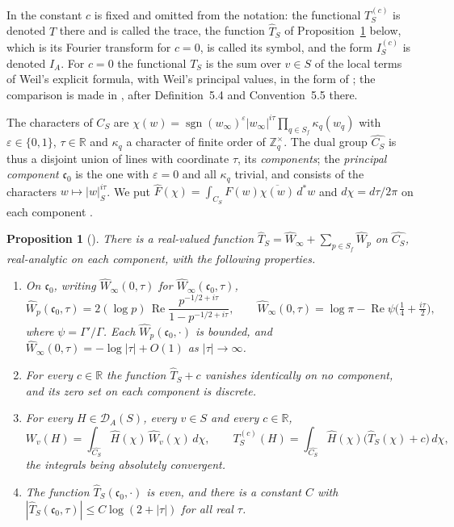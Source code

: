 \documentclass[11pt]{amsart}
\newtheorem{proposition}[theorem]{Proposition}
\theoremstyle{remark}
\numberwithin{equation}{section}
\newcommand{\R}{\mathbb R}
\newcommand{\Z}{\mathbb Z}
\newcommand{\Rel}{\operatorname{Re}}
\newcommand{\DA}{\mathcal D_A}
\newcommand{\CS}{C_S}
\newcommand{\cz}{\mathfrak c_0}
\begin{document}
In \cite{P43} the constant $c$ is fixed and omitted from the notation: the
functional $T^{(c)}_S$ is denoted $T$ there and is called the trace, the
function $\widehat T_S$ of Proposition~\ref{prop:symbol} below, which is its
Fourier transform for $c=0$, is called its symbol, and the form $I^{(c)}_S$
is denoted $I_A$.  For $c=0$ the functional $T_S$ is the sum over $v\in S$ of the local
terms of Weil's explicit formula, with Weil's principal values, in the form
of \cite[Appendix~II]{Connes99}; the comparison is made in
\cite[Section~5]{P43}, after Definition~5.4 and Convention~5.5 there.

The characters of $\CS$ are
$\chi(w)=\operatorname{sgn}(w_\infty)^{\varepsilon}|w_\infty|^{i\tau}
\prod_{q\in S_f}\kappa_q(w_q)$ with $\varepsilon\in\{0,1\}$, $\tau\in\R$ and
$\kappa_q$ a character of finite order of $\Z_q^\times$.  The dual group
$\widehat{\CS}$ is thus a disjoint union of lines with coordinate $\tau$, its
\emph{components}; the \emph{principal component} $\cz$ is the one with
$\varepsilon=0$ and all $\kappa_q$ trivial, and consists of the characters
$w\mapsto|w|_S^{i\tau}$.  We put
$\widehat F(\chi)=\int_{\CS}F(w)\overline{\chi(w)}\,d^*w$ and
$d\chi=d\tau/2\pi$ on each component \cite[(40), (41) and the text after (43)]{P43}.

\begin{proposition}[{\cite[Theorem~5.12 and (69)]{P43}}]
\label{prop:symbol}
There is a real-valued function
$\widehat T_S=\widehat W_\infty+\sum_{p\in S_f}\widehat W_p$ on
$\widehat{\CS}$, real-analytic on each component, with the following
properties.
\begin{enumerate}
\item[(a)] On $\cz$, writing $\widehat W_\infty(0,\tau)$ for
$\widehat W_\infty(\cz,\tau)$,
\begin{equation}
\label{eq:symbolclosed}
  \widehat W_p(\cz,\tau)=2(\log p)\,\Rel\frac{p^{-1/2+i\tau}}{1-p^{-1/2+i\tau}},
  \qquad
  \widehat W_\infty(0,\tau)=\log\pi-\Rel\psi\bigl(\tfrac14+\tfrac{i\tau}2\bigr),
\end{equation}
where $\psi=\Gamma'/\Gamma$.  Each $\widehat W_p(\cz,\cdot)$ is bounded, and
$\widehat W_\infty(0,\tau)=-\log|\tau|+O(1)$ as $|\tau|\to\infty$.
\item[(b)] For every $c\in\R$ the function $\widehat T_S+c$ vanishes
identically on no component, and its zero set on each component is discrete.
\item[(c)] For every $H\in\DA(S)$, every $v\in S$ and every $c\in\R$,
\begin{equation}
\label{eq:plancherel}
  W_v(H)=\int_{\widehat{\CS}}\widehat H(\chi)\,\widehat W_v(\chi)\,d\chi,\qquad
  T^{(c)}_S(H)=\int_{\widehat{\CS}}\widehat H(\chi)
     \bigl(\widehat T_S(\chi)+c\bigr)\,d\chi ,
\end{equation}
the integrals being absolutely convergent.
\item[(d)] The function $\widehat T_S(\cz,\cdot)$ is even, and there is a
constant $C$ with $|\widehat T_S(\cz,\tau)|\le C\log(2+|\tau|)$ for all real
$\tau$.
\end{enumerate}
\end{proposition}
\end{document}
